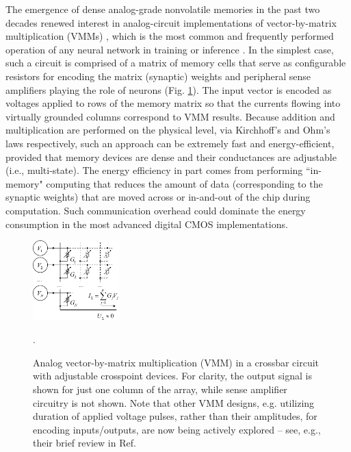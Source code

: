 The emergence of dense analog-grade nonvolatile memories in the past two decades renewed interest in analog-circuit implementations of vector-by-matrix multiplication (VMMs) \cite{Mead1990, Holmes1993, Alibart2012, Widrow1962, Chawla2004, Guo2017CICC, MerrikhBayat2015}, which is the most common and frequently performed operation of any neural network in training or inference \cite{Hertz1991, Gerstner2002}. In the simplest case, such a circuit is comprised of a matrix of memory cells that serve as configurable resistors for encoding the matrix (synaptic) weights and peripheral sense amplifiers playing the role of neurons (Fig. \ref{fig:VMM}). The input vector is encoded as voltages applied to rows of the memory matrix so that the currents flowing into virtually grounded columns correspond to VMM results. Because addition and multiplication are performed on the physical level, via Kirchhoff's and Ohm's laws respectively, such an approach can be extremely fast and energy-efficient, provided that memory devices are dense and their conductances are adjustable (i.e., multi-state). The energy efficiency in part comes from performing ``in-memory" computing that reduces the amount of data (corresponding to the synaptic weights) that are moved across or in-and-out of the chip during computation. Such communication overhead could dominate the energy consumption in the most advanced digital CMOS implementations.

\begin{figure}[!t]
\centering
\includegraphics[width=0.30\textwidth]{figures/vmm.png}
\caption{Analog vector-by-matrix multiplication (VMM) in a crossbar circuit with adjustable crosspoint devices. For clarity, the output signal is shown for just one column of the array, while sense amplifier circuitry is not shown. Note that other VMM designs, e.g. utilizing duration of applied voltage pulses, rather than their amplitudes, for encoding inputs/outputs, are now being actively explored – see, e.g., their brief review in Ref. \cite{Bavandpour2018}}.
\label{fig:VMM}
\end{figure}

